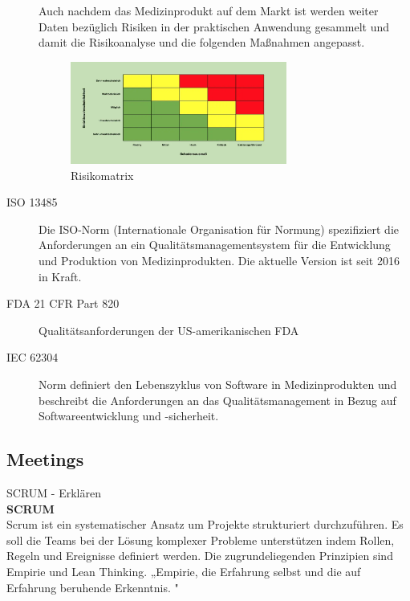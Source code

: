\documentclass[a4paper, 12pt]{article}
\begin{document}
\begin{description}
	Auch nachdem das Medizinprodukt auf dem Markt ist werden weiter Daten bezüglich Risiken in der praktischen Anwendung gesammelt und damit die Risikoanalyse und die folgenden Maßnahmen angepasst.
	\begin{figure}[H]
	\centering
	\includegraphics[width=0.7\textwidth]{risiko_matrix.png}
	\caption{Risikomatrix \cite{pic_risikomanagement}}
	\label{risikomatrix}
	\end{figure}

	\item[ISO 13485] \label{iso13485}
	Die ISO-Norm (Internationale Organisation für Normung) spezifiziert die Anforderungen an ein Qualitätsmanagementsystem für die Entwicklung und Produktion von Medizinprodukten. Die aktuelle Version ist seit 2016 in Kraft. 
	
	\item[FDA 21 CFR Part 820] \label{fda}
	Qualitätsanforderungen der US-amerikanischen FDA
	
	\item[IEC 62304] \label{iec62304}
	Norm definiert den Lebenszyklus von Software in Medizinprodukten und beschreibt die Anforderungen an das Qualitätsmanagement in Bezug auf Softwareentwicklung und -sicherheit.

\end{description}
\cite{sw_als_medizinprodukt}



\subsection{Meetings}\label{Meetings}
SCRUM - Erklären
\\ 
\textbf{SCRUM}\\
Scrum ist ein systematischer Ansatz um Projekte strukturiert durchzuführen. Es soll die Teams bei der Lösung komplexer Probleme unterstützen indem Rollen, Regeln und Ereignisse definiert werden. Die zugrundeliegenden Prinzipien sind Empirie und Lean Thinking. 
„Empirie, die Erfahrung selbst und die auf Erfahrung beruhende Erkenntnis.  
 \cite{dorsch_empirie}" 
\end{document}
